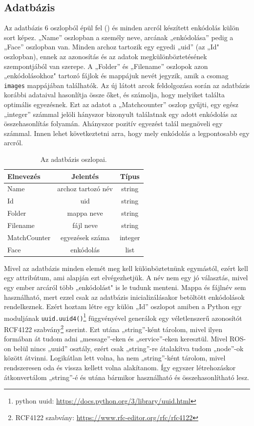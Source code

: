 \subsection{Adatbázis}
Az adatbázis 6 oszlopból épül fel () és minden arcról készített enkódolás külön sort képez. „Name” oszlopban a személy neve, arcának „enkódolása” pedig a „Face” oszlopban van. Minden archoz tartozik egy egyedi „uid” (az „Id" oszlopban), ennek az azonosítás és az adatok megkülönböztetésének szempontjából van szerepe. A „Folder” és „Filename” oszlopok azon „enkódolásokhoz" tartozó fájlok és mappájuk nevét jegyzik, amik a csomag \verb|images| mappájában találhatók. Az új látott arcok feldolgozása során az adatbázis korábbi adataival hasonlítja össze őket, és számolja, hogy melyiket találta optimális egyezésnek. Ezt az adatot a „Matchcounter” oszlop gyűjti, egy egész „integer” számmal jelöli hányszor bizonyult találatnak egy adott enkódolás az összehasonlítás folyamán. Ahányszor pozitív egyezést talál megnöveli egy számmal. Innen lehet következtetni arra, hogy mely enkódolás a legpontosabb egy arcról.
\begin{table}[!ht]
	\footnotesize
	\centering
	\begin{tabular}{ l c c }
		\toprule
		Elnevezés & Jelentés & Típus \\
		\midrule
        Name & archoz tartozó név & string\\
        Id & uid & string\\
        Folder & mappa neve & string\\
        Filename & fájl neve & string\\
        MatchCounter & egyezések száma & integer\\
        Face & enkódolás & list\\
		\bottomrule
	\end{tabular}
	\caption{Az adatbázis oszlopai.}
	\label{tab:adatb}
\end{table}

Mivel az adatbázis minden elemét meg kell különböztetnünk egymástól, ezért kell egy attribútum, ami alapján ezt elvégezhetjük. A név nem egy jó választás, mivel egy ember arcáról több „enkódolást" is le tudunk menteni. Mappa és fájlnév sem használható, mert ezzel csak az adatbázis inicializálásakor betöltött enkódolások rendelkeznek. Ezért hoztam létre egy külön „Id” oszlopot amiben a Python egy moduljának \verb|uuid.uuid4()|\footnote{python uuid: \url{https://docs.python.org/3/library/uuid.html}} függvényével generálok egy véletlenszerű azonosítót RCF4122 szabvány\footnote{RCF4122 szabvány: \url{https://www.rfc-editor.org/rfc/rfc4122}} szerint. Ezt utána „string”-ként tárolom, mivel ilyen formában át tudom adni „message”-eken és „service”-eken keresztül. Mivel ROS-on belül nincs „uuid” osztály, ezért csak „string”-re átalakítva tudom „node”-ok között átvinni. Logikátlan lett volna, ha nem „string”-ként tárolom, mivel rendszeresen oda és vissza kellett volna alakítanom. Így egyszer létrehozáskor átkonvertálom „string”-é és utána bármikor használható és összehasonlítható lesz.




